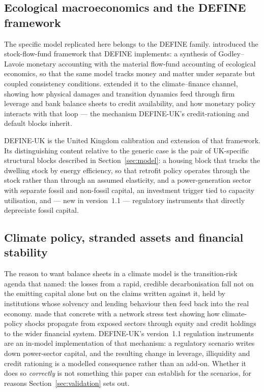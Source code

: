 \subsection{Ecological macroeconomics and the DEFINE framework}

The specific model replicated here belongs to the DEFINE family. \citet{dafermos2017} introduced the stock-flow-fund framework that DEFINE implements: a synthesis of Godley--Lavoie monetary accounting with the material flow-fund accounting of ecological economics, so that the same model tracks money and matter under separate but coupled consistency conditions. \citet{dafermos2018} extended it to the climate--finance channel, showing how physical damages and transition dynamics feed through firm leverage and bank balance sheets to credit availability, and how monetary policy interacts with that loop --- the mechanism DEFINE-UK's credit-rationing and default blocks inherit.

DEFINE-UK \citep{georgedafermos2026manual} is the United Kingdom calibration and extension of that framework. Its distinguishing content relative to the generic case is the pair of UK-specific structural blocks described in Section~\ref{sec:model}: a housing block that tracks the dwelling stock by energy efficiency, so that retrofit policy operates through the stock rather than through an assumed elasticity, and a power-generation sector with separate fossil and non-fossil capital, an investment trigger tied to capacity utilisation, and --- new in version~1.1 --- regulatory instruments that directly depreciate fossil capital.

\subsection{Climate policy, stranded assets and financial stability}

The reason to want balance sheets in a climate model is the transition-risk agenda that \citet{carney2015} named: the losses from a rapid, credible decarbonisation fall not on the emitting capital alone but on the claims written against it, held by institutions whose solvency and lending behaviour then feed back into the real economy. \citet{battiston2017} made that concrete with a network stress test showing how climate-policy shocks propagate from exposed sectors through equity and credit holdings to the wider financial system. DEFINE-UK's version~1.1 regulation instruments are an in-model implementation of that mechanism: a regulatory scenario writes down power-sector capital, and the resulting change in leverage, illiquidity and credit rationing is a modelled consequence rather than an add-on. Whether it does so \emph{correctly} is not something this paper can establish for the scenarios, for reasons Section~\ref{sec:validation} sets out.

